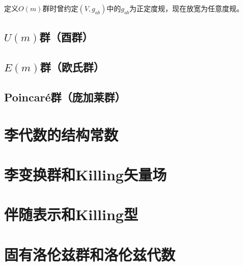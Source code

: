 定义$O(m)$群时曾约定$(V, g_{ab})$中的$g_{ab}$为正定度规，现在放宽为任意度规。


\subsection{$U(m)$群（酉群）}

\subsection{$E(m)$群（欧氏群）}

\subsection{Poincaré群（庞加莱群）}

\section{李代数的结构常数}

\section{李变换群和Killing矢量场}

\section{伴随表示和Killing型}

\section{固有洛伦兹群和洛伦兹代数}

